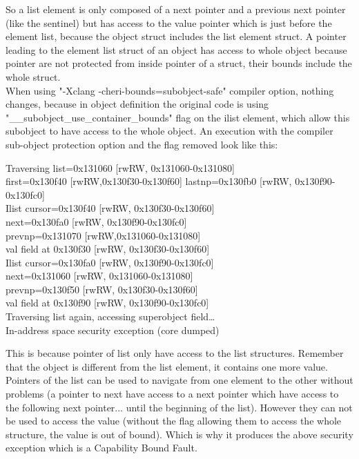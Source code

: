 \documentclass[a4paper, 11pt]{article}
\begin{document}
So a list element is only composed of a next pointer and a previous next pointer (like the sentinel) but has access to the value pointer which is just before the element list, because the object struct includes the list element struct. A pointer leading to the element list struct of an object has access to whole object because pointer are not protected from inside pointer of a struct, their bounds include the whole struct.\\

When using "-Xclang -cheri-bounds=subobject-safe" compiler option, nothing changes, because in object definition the original code is using "\_\_subobject\_use\_container\_bounds" flag on the ilist element, which allow this subobject to have access to the whole object.
An execution with the compiler  sub-object protection option and the flag removed look like this:
\begin{tcolorbox}[colback=gray!5!white, colframe=blue!75!black, title=Output On an environment protected by CHERI \& Subobject protection]
	Traversing list=0x131060 [rwRW, 0x131060-0x131080] \\
	first=0x130f40 [rwRW,0x130f30-0x130f60] lastnp=0x130fb0 [rwRW, 0x130f90-0x130fc0]\\
	Ilist cursor=0x130f40 [rwRW, 0x130f30-0x130f60]\\
	next=0x130fa0 [rwRW, 0x130f90-0x130fc0]\\
	prevnp=0x131070 [rwRW,0x131060-0x131080]\\
	val field at 0x130f30 [rwRW, 0x130f30-0x130f60]\\
	Ilist cursor=0x130fa0 [rwRW, 0x130f90-0x130fc0]\\
	next=0x131060 [rwRW, 0x131060-0x131080]\\
	prevnp=0x130f50 [rwRW, 0x130f30-0x130f60]\\
	val field at 0x130f90 [rwRW, 0x130f90-0x130fc0]\\
	Traversing list again, accessing superobject field\dots\\
	In-address space security exception (core dumped)
\end{tcolorbox}

This is because pointer of list only have access to the list structures. Remember that the object is different from the list element, it contains one more value. Pointers of the list can be used to navigate from one element to the other without problems (a pointer to next have access to a next pointer which have access to the following next pointer... until the beginning of the list). However they can not be used to access the value (without the flag allowing them to access the whole structure, the value is out of bound).
Which is why it produces the above security exception which is a Capability Bound Fault.
\end{document}
